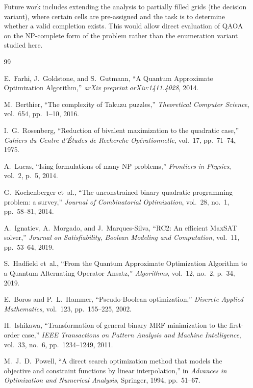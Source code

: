 \documentclass[eng]{ajceam-class}
\begin{document}
Future work includes extending the analysis to partially filled grids (the decision variant), where certain cells are pre-assigned and the task is to determine whether a valid completion exists. This would allow direct evaluation of QAOA on the NP-complete form of the problem rather than the enumeration variant studied here.


\begin{thebibliography}{99}

E.~Farhi, J.~Goldstone, and S.~Gutmann, ``A Quantum Approximate Optimization Algorithm,'' \textit{arXiv preprint arXiv:1411.4028}, 2014.

M.~Berthier, ``The complexity of Takuzu puzzles,'' \textit{Theoretical Computer Science}, vol.~654, pp.~1--10, 2016.

I.~G.~Rosenberg, ``Reduction of bivalent maximization to the quadratic case,'' \textit{Cahiers du Centre d'Études de Recherche Opérationnelle}, vol.~17, pp.~71--74, 1975.

A.~Lucas, ``Ising formulations of many NP problems,'' \textit{Frontiers in Physics}, vol.~2, p.~5, 2014.

G.~Kochenberger et~al., ``The unconstrained binary quadratic programming problem: a survey,'' \textit{Journal of Combinatorial Optimization}, vol.~28, no.~1, pp.~58--81, 2014.

A.~Ignatiev, A.~Morgado, and J.~Marques-Silva, ``RC2: An efficient MaxSAT solver,'' \textit{Journal on Satisfiability, Boolean Modeling and Computation}, vol.~11, pp.~53--64, 2019.

S.~Hadfield et~al., ``From the Quantum Approximate Optimization Algorithm to a Quantum Alternating Operator Ansatz,'' \textit{Algorithms}, vol.~12, no.~2, p.~34, 2019.

E.~Boros and P.~L.~Hammer, ``Pseudo-Boolean optimization,'' \textit{Discrete Applied Mathematics}, vol.~123, pp.~155--225, 2002.

H.~Ishikawa, ``Transformation of general binary MRF minimization to the first-order case,'' \textit{IEEE Transactions on Pattern Analysis and Machine Intelligence}, vol.~33, no.~6, pp.~1234--1249, 2011.

M.~J.~D.~Powell, ``A direct search optimization method that models the objective and constraint functions by linear interpolation,'' in \textit{Advances in Optimization and Numerical Analysis}, Springer, 1994, pp.~51--67.


\end{thebibliography}
\end{document}
